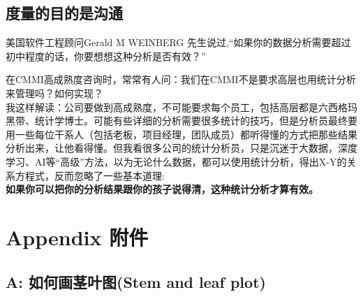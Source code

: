 \hypertarget{ux5ea6ux91cfux7684ux76eeux7684ux662fux6c9fux901a}{%
\subsection{度量的目的是沟通}\label{ux5ea6ux91cfux7684ux76eeux7684ux662fux6c9fux901a}}


美国软件工程顾问Gerald M WEINBERG
先生说过,``如果你的数据分析需要超过初中程度的话，你要想想这种分析是否有效？''

在CMMI高成熟度咨询时，常常有人问：我们在CMMI不是要求高层也用统计分析来管理吗？如何实现？\\
我这样解读：公司要做到高成熟度，不可能要求每个员工，包括高层都是六西格玛黑带、统计学博士。可能有些详细的分析需要很多统计的技巧，但是分析员最终要用一些每位干系人（包括老板，项目经理，团队成员）都听得懂的方式把那些结果分析出来，让他看得懂。但我看很多公司的统计分析员，只是沉迷于大数据，深度学习、AI等``高级''方法，以为无论什么数据，都可以使用统计分析，得出X-Y的关系方程式，反而忽略了一些基本道理:\\
\textbf{如果你可以把你的分析结果跟你的孩子说得清，这种统计分析才算有效。}\\

\hypertarget{appendix-ux9644ux4ef6}{%
\section{Appendix 附件}\label{appendix-ux9644ux4ef6}}

\hypertarget{a-ux5982ux4f55ux753bux830eux53f6ux56festem-and-leaf-plot}{%
\subsection{A: 如何画茎叶图(Stem and leaf
plot)}\label{a-ux5982ux4f55ux753bux830eux53f6ux56festem-and-leaf-plot}}

